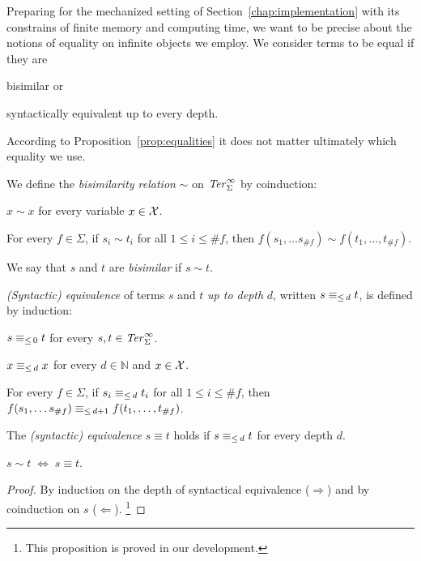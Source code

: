 Preparing for the mechanized setting of Section~\ref{chap:implementation} with
its constrains of finite memory and computing time, we want to be precise
about the notions of equality on infinite objects we employ. We consider terms
to be equal if they are
\begin{inparaenum}[(i)]
  \item bisimilar or
  \item syntactically equivalent up to every depth.
\end{inparaenum}
According to Proposition~\ref{prop:equalities} it does not matter
ultimately which equality we use.

\begin{definition}\label{def:bisimilarity}%
We define the \emph{bisimilarity relation} $\sim$ on $\mathit{Ter}_\Sigma^\infty$ by
coinduction:
\begin{compactenum}
  \item
    $x \sim x$ for every variable $x \in \mathcal{X}$.
  \item
    For every $f \in \Sigma$, if $s_i \sim t_i$ for all $1 \leq i \leq \#f$,
    then $f(s_1, \ldots s_{\#f}) \sim f(t_1, \ldots, t_{\#f})$.
\end{compactenum}
We say that $s$ and $t$ are \emph{bisimilar} if $s \sim t$.
\end{definition}

\begin{definition}\label{def:equiv}%
\emph{(Syntactic) equivalence} of terms $s$ and $t$ \emph{up to depth} $d$,
written $s \equiv_{\le \, d} t$, is defined by induction:
\begin{compactenum}
  \item $s \equiv_{\le \, 0} t$ for every $s, t \in \mathit{Ter}_\Sigma^\infty$.
  \item $x \equiv_{\le \, d} x$ for every $d \in \mathbb{N}$ and $x \in \mathcal{X}$.
  \item For every $f \in \Sigma$, if $s_i \equiv_{\le \, d} t_i$ for all $1 \leq i
    \leq \#f$, then $f(s_1, \ldots s_{\#f}) \equiv_{\le \, d+1} f(t_1, \ldots,
    t_{\#f})$.
\end{compactenum}
The \emph{(syntactic) equivalence} $s \equiv t$ holds if $s \equiv_{\le \, d} t$ for
every depth $d$.
\end{definition}

\begin{proposition}\label{prop:equalities}
$s \sim t \; \Leftrightarrow \; s \equiv t$.
\end{proposition}
\begin{proof}
By induction on the depth of syntactical equivalence ($\Rightarrow$) and by
coinduction on $s$ ($\Leftarrow$).
\footnote{This proposition is proved in our \Coq development.}
\end{proof}

